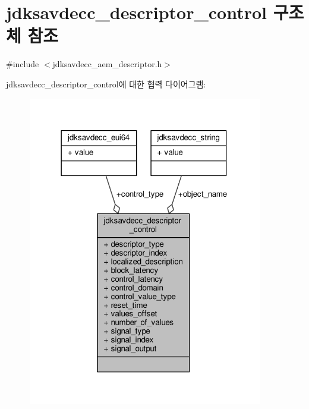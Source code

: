 \hypertarget{structjdksavdecc__descriptor__control}{}\section{jdksavdecc\+\_\+descriptor\+\_\+control 구조체 참조}
\label{structjdksavdecc__descriptor__control}


{\ttfamily \#include $<$jdksavdecc\+\_\+aem\+\_\+descriptor.\+h$>$}



jdksavdecc\+\_\+descriptor\+\_\+control에 대한 협력 다이어그램\+:
\nopagebreak
\begin{figure}[H]
\begin{center}
\leavevmode
\includegraphics[width=290pt]{structjdksavdecc__descriptor__control__coll__graph}
\end{center}
\end{figure}
